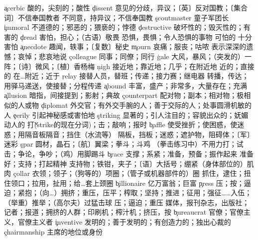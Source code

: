\begin{multicols}{2}
\c{acerbic}  \a 酸的，尖刻的；酸性
\c{dissent}  \n 意见的分歧，异议；〔英〕反对国教；〔集合词〕不信奉国教者 \vi 不同意，持异议；不信奉国教
\c{scoutmaster}  \n 童子军团长
\c{immoral}  \a 不道德的；邪恶的；猥亵的；悖德
\c{destructive}  \a 破坏性的；毁灭性的；有害的
\c{dread}  \vt 害怕，担心；（古语）敬畏 \n 恐惧，畏惧；令人恐惧的事物 \a 可怕的 \vi 十分害怕
\c{anecdote}  \n 趣闻，轶事；〔复数〕秘史
\c{mourn}  \vi 哀痛；服丧；咕哝 \vt 表示深深的遗憾；哀悼；悲哀地说
\c{colleague}  \n 同事；同僚；同行
\c{gale}  \n 大风，暴风；（突发的）一阵；〔诗〕微风；〔植〕香杨梅
\c{nigh}  \ad 接近地；靠近地；几乎；在附近地 \a 近的；直接的 \prep 在…附近；近于
\c{relay}  \n 接替人员，替班；传递；接力赛；继电器 \vt 转播，传达；用驿马递送，使接替；分程传递
\c{abound}  \vi 丰富，盛产；非常多，大量存在；充满
\c{allusion}  \n 暗指，间接提到；影射；典故
\c{counterpart}  \n 配对物；副本；相对物；极相似的人或物
\c{diplomat}  \n 外交官；有外交手腕的人；善于交际的人；处事圆滑机敏的人
\c{eerily}  \ad 引起神秘感或害怕地
\c{striking}  \a 显著的；引人注目的；容貌出众的；妩媚动人的 \v 打(strike的现在分词)；击；敲响；报时
\c{baffle}  \vt 使受挫折；使困惑，使迷惑；用隔音板隔音；挡住（水流等） \n 隔板，挡板；迷惑；遮护物，阻碍体；〔军〕迷彩
\c{spar}  \n 圆材，晶石；〔航〕翼梁；拳斗；斗鸡 \vi （拳击练习中）不用力打；试击；争论，争吵；（鸡）用脚踢斗
\c{brace}  \vt 支撑；系紧；准备，预备；振作起来 \vi 准备好；支持；打起精神 \n 支持物；铁钳，夹子；〔语〕大括号；绷紧（身体部位的）肌肉
\c{collar}  \n 衣领；领子；（狗等的）项圈；（管子或机器部件的）圈 \vt 抓住，逮住；扭住领口；拉用，扯用；给…套上颈圈
\c{billionaire}  \n 亿万富翁；巨富
\c{press}  \vt 压；按；逼迫；紧抱；（向…）拥挤；重压，压平；榨取；坚持；推进；征用；强征……入伍；（举重）推举；（高尔夫）过猛击球 \vi 压；逼迫；重压 \n 媒体，报刊杂志，出版社；记者；报道；拥挤的人群；印刷机；榨汁机；挤压，按
\c{bureaucrat}  \n 官僚；官僚主义，官僚主义者
\c{inventive}  \a 发明的；善于发明的；有创造力的；独出心裁的
\c{chairmanship}  \n 主席的地位或身份
\end{multicols}

